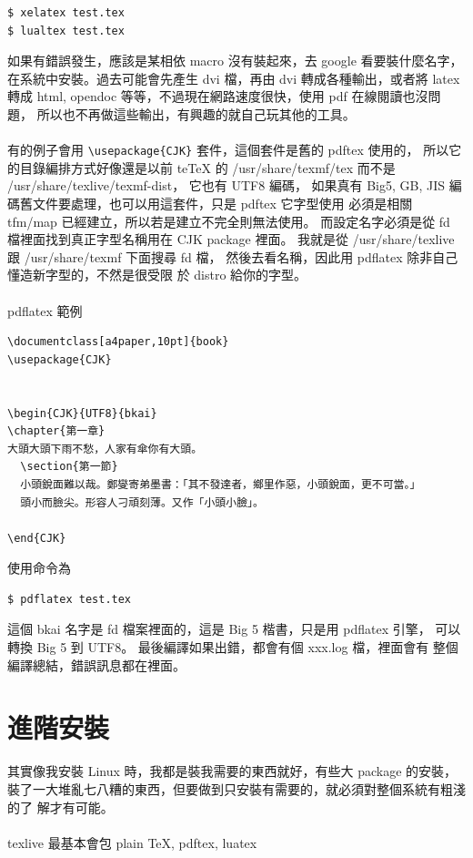 \begin{verbatim}
$ xelatex test.tex
$ lualtex test.tex
\end{verbatim}

如果有錯誤發生，應該是某相依 macro 沒有裝起來，去 google 看要裝什麼名字，
在系統中安裝。過去可能會先產生 dvi 檔，再由 dvi 轉成各種輸出，或者將 latex 
轉成 html, opendoc 等等，不過現在網路速度很快，使用 pdf 在線閱讀也沒問題，
所以也不再做這些輸出，有興趣的就自己玩其他的工具。
\\\\
有的例子會用 \verb=\usepackage{CJK}= 套件，這個套件是舊的 pdftex 使用的，
所以它的目錄編排方式好像還是以前 teTeX 的 /usr/share/texmf/tex 而不是
/usr/share/texlive/texmf-dist， 它也有 UTF8 編碼， 如果真有 Big5, 
GB, JIS 編碼舊文件要處理，也可以用這套件，只是 pdftex 它字型使用
必須是相關 tfm/map 已經建立，所以若是建立不完全則無法使用。
而設定名字必須是從 fd 檔裡面找到真正字型名稱用在 CJK package 裡面。
我就是從 /usr/share/texlive 跟 /usr/share/texmf 下面搜尋 fd 檔，
然後去看名稱，因此用 pdflatex 除非自己懂造新字型的，不然是很受限
於 distro 給你的字型。
\\\\
pdflatex 範例
\begin{verbatim}
\documentclass[a4paper,10pt]{book}
\usepackage{CJK}


\begin{CJK}{UTF8}{bkai}
\chapter{第一章}
大頭大頭下雨不愁，人家有傘你有大頭。
  \section{第一節}
  小頭銳面難以哉。鄭燮寄弟墨書：「其不發達者，鄉里作惡，小頭銳面，更不可當。」
  頭小而臉尖。形容人刁頑刻薄。又作「小頭小臉」。

\end{CJK}

\end{verbatim}
使用命令為 
\begin{verbatim}
$ pdflatex test.tex
\end{verbatim}
這個 bkai 名字是 fd 檔案裡面的，這是 Big 5 楷書，只是用 pdflatex 引擎，
可以轉換 Big 5 到 UTF8。 最後編譯如果出錯，都會有個 xxx.log 檔，裡面會有
整個編譯總結，錯誤訊息都在裡面。

\section{進階安裝}
其實像我安裝 Linux 時，我都是裝我需要的東西就好，有些大 package 的安裝，
裝了一大堆亂七八糟的東西，但要做到只安裝有需要的，就必須對整個系統有粗淺的了
解才有可能。
\\\\
texlive 最基本會包 plain \TeX, pdftex, luatex
